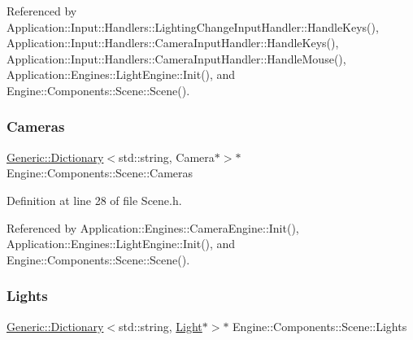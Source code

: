 Referenced by Application\+::\+Input\+::\+Handlers\+::\+Lighting\+Change\+Input\+Handler\+::\+Handle\+Keys(), Application\+::\+Input\+::\+Handlers\+::\+Camera\+Input\+Handler\+::\+Handle\+Keys(), Application\+::\+Input\+::\+Handlers\+::\+Camera\+Input\+Handler\+::\+Handle\+Mouse(), Application\+::\+Engines\+::\+Light\+Engine\+::\+Init(), and Engine\+::\+Components\+::\+Scene\+::\+Scene().

\mbox{\label{classEngine_1_1Components_1_1Scene_aea98ff1ced88ee859878b504e9a2a362}} 
\subsubsection{\texorpdfstring{Cameras}{Cameras}}
{\footnotesize\ttfamily \mbox{\hyperlink{classGeneric_1_1Dictionary}{Generic\+::\+Dictionary}}$<$std\+::string, Camera$\ast$$>$$\ast$ Engine\+::\+Components\+::\+Scene\+::\+Cameras\hspace{0.3cm}{\ttfamily [inherited]}}



Definition at line 28 of file Scene.\+h.



Referenced by Application\+::\+Engines\+::\+Camera\+Engine\+::\+Init(), Application\+::\+Engines\+::\+Light\+Engine\+::\+Init(), and Engine\+::\+Components\+::\+Scene\+::\+Scene().

\mbox{\label{classEngine_1_1Components_1_1Scene_a00f60de2f6c72242a7af0076a3b75e5e}} 
\subsubsection{\texorpdfstring{Lights}{Lights}}
{\footnotesize\ttfamily \mbox{\hyperlink{classGeneric_1_1Dictionary}{Generic\+::\+Dictionary}}$<$std\+::string, \mbox{\hyperlink{classLight}{Light}}$\ast$$>$$\ast$ Engine\+::\+Components\+::\+Scene\+::\+Lights\hspace{0.3cm}{\ttfamily [inherited]}}



